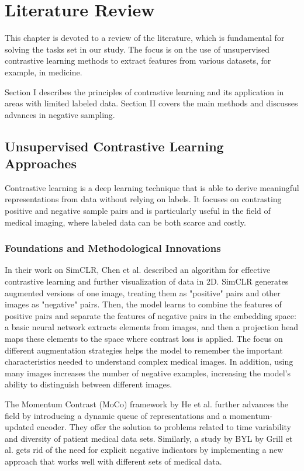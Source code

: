 \chapter{Literature Review}
\label{chap:lr}

This chapter is devoted to a review of the literature, which is fundamental for solving the tasks set in our study. The focus is on the use of unsupervised contrastive learning methods to extract features from various datasets, for example, in medicine. 

Section I describes the principles of contrastive learning and its application in areas with limited labeled data. Section II covers the main methods and discusses advances in negative sampling.

\section{Unsupervised Contrastive Learning Approaches}
Contrastive learning is a deep learning technique that is able to derive meaningful representations from data without relying on labels. It focuses on contrasting positive and negative sample pairs and is particularly useful in the field of medical imaging, where labeled data can be both scarce and costly.

\subsection{Foundations and Methodological Innovations}

In their work on SimCLR, Chen et al. \cite{tsimcne} described an algorithm for effective contrastive learning and further visualization of data in 2D. SimCLR generates augmented versions of one image, treating them as "positive" pairs and other images as "negative" pairs. Then, the model learns to combine the features of positive pairs and separate the features of negative pairs in the embedding space: a basic neural network extracts elements from images, and then a projection head maps these elements to the space where contrast loss is applied. The focus on different augmentation strategies helps the model to remember the important characteristics needed to understand complex medical images. In addition, using many images increases the number of negative examples, increasing the model's ability to distinguish between different images.

The Momentum Contrast (MoCo) framework by He et al. \cite{moco} further advances the field by introducing a dynamic queue of representations and a momentum-updated encoder. They offer the solution to problems related to time variability and diversity of patient medical data sets. Similarly, a study by BYL by Grill et al. \cite{byol} gets rid of the need for explicit negative indicators by implementing a new approach that works well with different sets of medical data.

